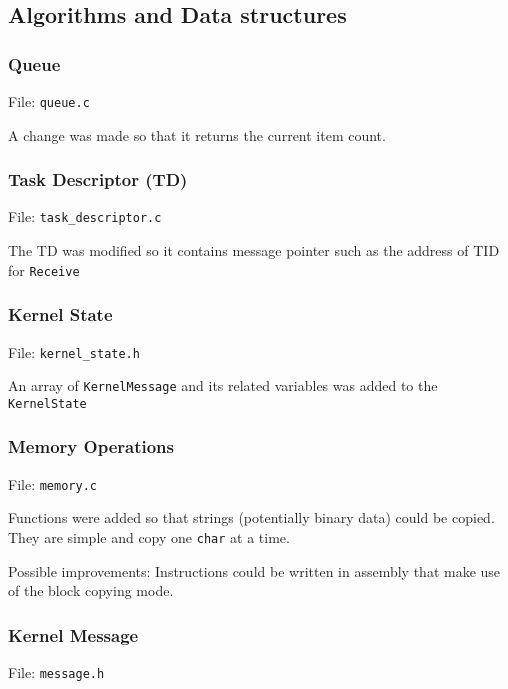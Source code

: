 \documentclass[letterpaper]{article}
\begin{document}
\subsection{Algorithms and Data structures%
  \label{algorithms-and-data-structures}%
}


\subsubsection{Queue%
  \label{queue}%
}

File: \texttt{queue.c}

A change was made so that it returns the current item count.


\subsubsection{Task Descriptor (TD)%
  \label{task-descriptor-td}%
}

File: \texttt{task\_descriptor.c}

The TD was modified so it contains message pointer such as the address of TID for \texttt{Receive}


\subsubsection{Kernel State%
  \label{kernel-state}%
}

File: \texttt{kernel\_state.h}

An array of \texttt{KernelMessage} and its related variables was added to the \texttt{KernelState}


\subsubsection{Memory Operations%
  \label{memory-operations}%
}

File: \texttt{memory.c}

Functions were added so that strings (potentially binary data) could be copied. They are simple and copy one \texttt{char} at a time.

Possible improvements: Instructions could be written in assembly that make use of the block copying mode.


\subsubsection{Kernel Message%
  \label{kernel-message}%
}

File: \texttt{message.h}
\end{document}
